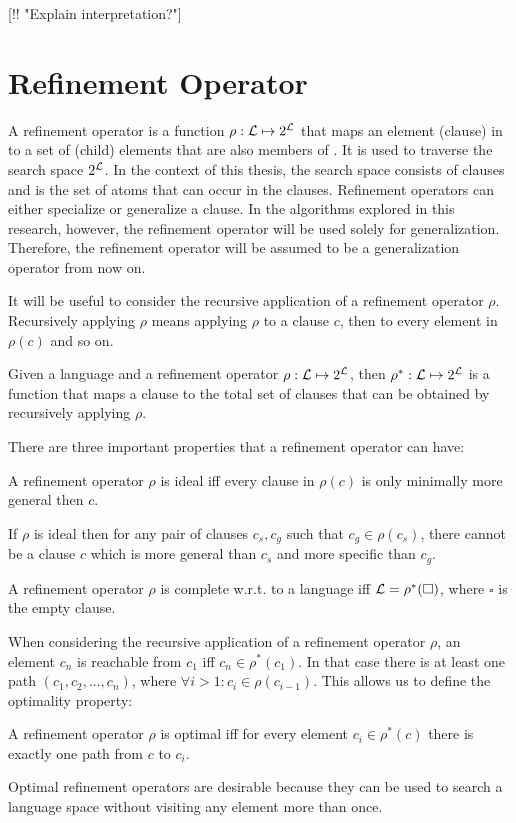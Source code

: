 [!! "Explain interpretation?"]

\section{Refinement Operator}
\label{sec:bg_ref_op}
A refinement operator is a function $\rho : \mathcal{L} \mapsto 2^{\mathcal{L}}$ that maps an element (clause) in  to a set of (child) elements that are also members of . It is used to traverse the search space $2^{\mathcal{L}}$. In the context of this thesis, the search space consists of clauses and  is the set of atoms that can occur in the clauses. Refinement operators can either specialize or generalize a clause. In the algorithms explored in this research, however, the refinement operator will be used solely for generalization. Therefore, the refinement operator will be assumed to be a generalization operator from now on.

It will be useful to consider the recursive application of a refinement operator $\rho$. Recursively applying $\rho$ means applying $\rho$ to a clause $c$, then to every element in $\rho(c)$ and so on.
\begin{definition}
Given a language  and a refinement operator $\rho: \mathcal{L} \mapsto 2^{\mathcal{L}}$, then $\rho^* : \mathcal{L} \mapsto 2^{\mathcal{L}}$ is a function that maps a clause to the total set of clauses that can be obtained by recursively applying $\rho$.
\end{definition}
There are three important properties that a refinement operator can have:
\begin{definition}
A refinement operator $\rho$ is ideal iff every clause in $\rho(c)$ is only minimally more general then $c$.
\end{definition}
If $\rho$ is ideal then for any pair of clauses $c_s, c_g$ such that $c_g \in \rho(c_s)$, there cannot be a clause $c$ which is more general than $c_s$ and more specific than $c_g$.
\begin{definition}
A refinement operator $\rho$ is complete w.r.t. to a language  iff $\mathcal{L} = \rho^*(\square)$, where $\square$ is the empty clause.
\end{definition}
When considering the recursive application of a refinement operator $\rho$, an element $c_n$ is reachable from $c_1$ iff $c_n \in \rho^*(c_1)$. In that case there is at least one path $(c_1, c_2, ..., c_n)$, where $\forall i > 1: c_i \in \rho(c_{i-1})$. This allows us to define the optimality property:
\begin{definition}
A refinement operator $\rho$ is optimal iff for every element $c_i \in \rho^*(c)$ there is exactly one path from $c$ to $c_i$.
\end{definition}
Optimal refinement operators are desirable because they can be used to search a language space  without visiting any element more than once.

